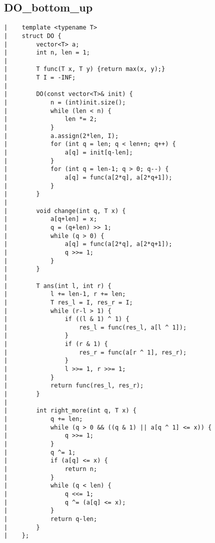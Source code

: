 \documentclass[a4paper, 10pt]{article}
\begin{document}
\begin{center}
\section*{DO\_bottom\_up}
\begin{verbatim}
|    template <typename T>
|    struct DO {
|        vector<T> a;
|        int n, len = 1;
|    
|        T func(T x, T y) {return max(x, y);}
|        T I = -INF;
|    
|        DO(const vector<T>& init) {
|            n = (int)init.size();
|            while (len < n) {
|                len *= 2;
|            }
|            a.assign(2*len, I);
|            for (int q = len; q < len+n; q++) {
|                a[q] = init[q-len];
|            }
|            for (int q = len-1; q > 0; q--) {
|                a[q] = func(a[2*q], a[2*q+1]);
|            }
|        }
|    
|        void change(int q, T x) {
|            a[q+len] = x;
|            q = (q+len) >> 1;
|            while (q > 0) {
|                a[q] = func(a[2*q], a[2*q+1]);
|                q >>= 1;
|            }
|        }
|    
|        T ans(int l, int r) {
|            l += len-1, r += len;
|            T res_l = I, res_r = I;
|            while (r-l > 1) {
|                if ((l & 1) ^ 1) {
|                    res_l = func(res_l, a[l ^ 1]);
|                }
|                if (r & 1) {
|                    res_r = func(a[r ^ 1], res_r);
|                }
|                l >>= 1, r >>= 1;
|            }
|            return func(res_l, res_r);
|        }
|    
|        int right_more(int q, T x) {
|            q += len;
|            while (q > 0 && ((q & 1) || a[q ^ 1] <= x)) {
|                q >>= 1;
|            }
|            q ^= 1;
|            if (a[q] <= x) {
|                return n;
|            }
|            while (q < len) {
|                q <<= 1;
|                q ^= (a[q] <= x);
|            }
|            return q-len;
|        }
|    };
\end{verbatim}


\end{center}
\end{document}
